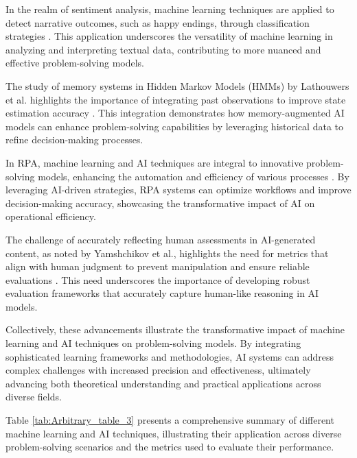 In the realm of sentiment analysis, machine learning techniques are applied to detect narrative outcomes, such as happy endings, through classification strategies \cite{jannidis2016analyzingfeaturesdetectionhappy}. This application underscores the versatility of machine learning in analyzing and interpreting textual data, contributing to more nuanced and effective problem-solving models.

The study of memory systems in Hidden Markov Models (HMMs) by Lathouwers et al. highlights the importance of integrating past observations to improve state estimation accuracy \cite{lathouwers2017memorypaysdiscordhidden}. This integration demonstrates how memory-augmented AI models can enhance problem-solving capabilities by leveraging historical data to refine decision-making processes.

In RPA, machine learning and AI techniques are integral to innovative problem-solving models, enhancing the automation and efficiency of various processes \cite{pandy2024advancementsroboticsprocessautomation}. By leveraging AI-driven strategies, RPA systems can optimize workflows and improve decision-making accuracy, showcasing the transformative impact of AI on operational efficiency.

The challenge of accurately reflecting human assessments in AI-generated content, as noted by Yamshchikov et al., highlights the need for metrics that align with human judgment to prevent manipulation and ensure reliable evaluations \cite{yamshchikov2020styletransferparaphraselookingsensible}. This need underscores the importance of developing robust evaluation frameworks that accurately capture human-like reasoning in AI models.

Collectively, these advancements illustrate the transformative impact of machine learning and AI techniques on problem-solving models. By integrating sophisticated learning frameworks and methodologies, AI systems can address complex challenges with increased precision and effectiveness, ultimately advancing both theoretical understanding and practical applications across diverse fields.

Table \ref{tab:Arbitrary_table_3} presents a comprehensive summary of different machine learning and AI techniques, illustrating their application across diverse problem-solving scenarios and the metrics used to evaluate their performance.

